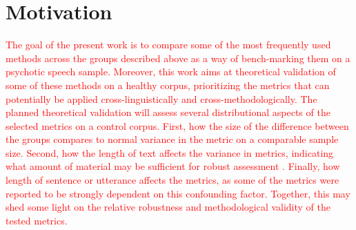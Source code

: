 
\section{Motivation}

\textcolor{red}{The goal of the present work is to compare some of the most frequently used methods across the groups described above as a way of bench-marking them on a psychotic speech sample. Moreover, this work aims at theoretical validation of some of these methods on a healthy corpus, prioritizing the metrics that can potentially be applied cross-linguistically and cross-methodologically. The planned theoretical validation will assess several distributional aspects of the selected metrics on a control corpus. First, how the size of the difference between the groups compares to normal variance in the metric on a comparable sample size. Second, how the length of text affects the variance in metrics, indicating what amount of material may be sufficient for robust assessment . Finally, how length of sentence or utterance affects the metrics, as some of the metrics were reported to be strongly dependent on this confounding factor. Together, this may shed some light on the relative robustness and methodological validity of the tested metrics.}








